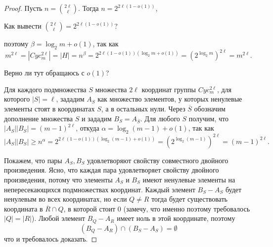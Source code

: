 \begin{proof}
	Пусть $n=\binom{2 \ell}{\ell}$. Тогда $n=2^{2\ell(1-o(1))}$, 
	\begin{question}
	  Как вывести $\binom{2 \ell}{\ell} = 2^{2\ell(1-o(1))}$?
	\end{question}
	поэтому $\beta=\log_2 m+o(1)$, так как
	\[
		m^{2\ell} = |Cyc_m^{2\ell}| = |H| = n^\beta=2^{2\ell(1-o(1))(\log_2 m+o(1))}=(2^{\log_2 m})^{2\ell} = m^{2\ell}.
	\]
	\begin{question}
	  Верно ли тут обращаюсь с $o(1)$?
	\end{question}

	Для каждого подмножества $S$ множества $2\ell$ координат группы $Cyc_m^{2\ell}$, для которого $|S|=\ell$, зададим $A_S$ как множество элементов, у которых ненулевые элементы стоят в координатах $S$, а в остальных нули. Через $\overline{S}$ обозначим дополнение множества $S$ и зададим $B_S = A_{\overline{S}}$. Для любого $S$ получим, что $|A_S||B_S|=(m-1)^{2\ell}$, откуда $\alpha = \log_2 (m-1)+o(1)$, так как
	\[
		|A_S||B_S| \geq n^\alpha = 2^{2\ell(1-o(1))(\log_2 (m-1)+o(1))} = (2^{\log_2 (m-1)})^{2\ell} = (m-1)^{2\ell}.
	\]

	Покажем, что пары $A_S, B_S$ удовлетворяют свойству совместного двойного произведения. Ясно, что каждая пара удовлетворяет свойству двойного произведения, потому что элементы $A_S$ и $B_S$ имеют ненулевые элементы на непересекающихся подмножествах координат. Каждый элемент $B_S-A_S$ будет ненулевым во всех координатах, но если $Q \neq R$ тогда будет существовать координата в $\overline{R} \cap Q$, в которой стоит 0 (замечу, что именно поэтому требовалось $|Q|=|R|$). Любой элемент $B_Q-A_R$ имеет ноль в этой координате, поэтому 
	\[
		(B_Q-A_R) \cap (B_S-A_S) = \emptyset
	\]
	что и требовалось доказать. 
\end{proof}

